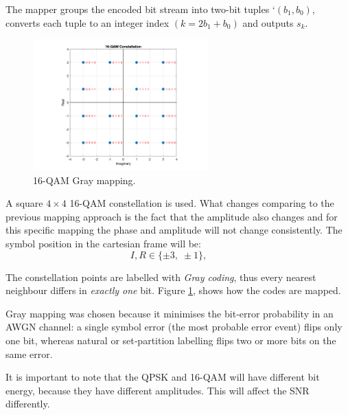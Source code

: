 The mapper groups the encoded bit stream into two-bit tuples `$(b_1,b_0)$, converts each tuple to an integer index $(k =2b_1+b_0)$ and outputs \(s_k\).


\begin{figure}[h]
  \centering
  \includegraphics[width=0.6\textwidth]{Images/16-QAM_Constellation.png}
  \caption{16-QAM Gray mapping.}
  \label{fig:QAM_Mapping}
\end{figure}


A square $4\times4$ 16-QAM constellation is used. What changes comparing to the previous mapping approach is the fact that the amplitude also changes and for this specific mapping the phase and amplitude will not change consistently. The symbol position in the cartesian frame will be:
\[
I,R \in \{\pm3,\;\pm1\},\qquad
\]

The constellation points are labelled with \emph{Gray coding}, thus every nearest neighbour differs in \emph{exactly one} bit. Figure \ref{fig:QAM_Mapping}, shows how the codes are mapped.
 
Gray mapping was chosen because it minimises the bit‑error probability in an AWGN channel: a single symbol error (the most probable error event) flips only one bit, whereas natural or set‑partition labelling flips two or more bits on the same error.  

It is important to note that the QPSK and 16-QAM will have different bit energy, because they have different amplitudes. This will affect the SNR differently.
